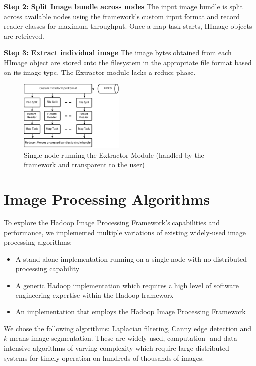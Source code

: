 \documentclass[conference]{IEEEtran}
\begin{document}
\textbf{Step 2: Split Image bundle across nodes} The input image
bundle is split across available nodes using the framework's custom
input format and record reader classes for maximum throughput. Once a
map task starts, HImage objects are retrieved.

\textbf{Step 3: Extract individual image} The image bytes obtained
from each HImage object are stored onto the filesystem in the
appropriate file format based on its image type.  The Extractor module
lacks a reduce phase.

\begin{figure}[h]
  \centering
  \includegraphics[width=0.45\textwidth]{ext-node}
  \caption{Single node running the Extractor Module (handled by the
    framework and transparent to the user)}
  \label{fig:ext-node}
\end{figure}


\section{Image Processing Algorithms}
\label{algorithms}
To explore the Hadoop Image Processing Framework's capabilities and
performance, we implemented multiple variations of existing
widely-used image processing algorithms:
\begin{itemize}
\item A stand-alone implementation running on a single node with no
  distributed processing capability
\item A generic Hadoop implementation which requires a high level of
  software engineering expertise within the Hadoop framework
\item An implementation that employs the Hadoop Image Processing
  Framework
\end{itemize}

We chose the following algorithms: Laplacian filtering, Canny edge
detection and $k$-means image segmentation.  These are widely-used,
computation- and data-intensive algorithms of varying complexity which
require large distributed systems for timely operation on hundreds of
thousands of images.
\end{document}
